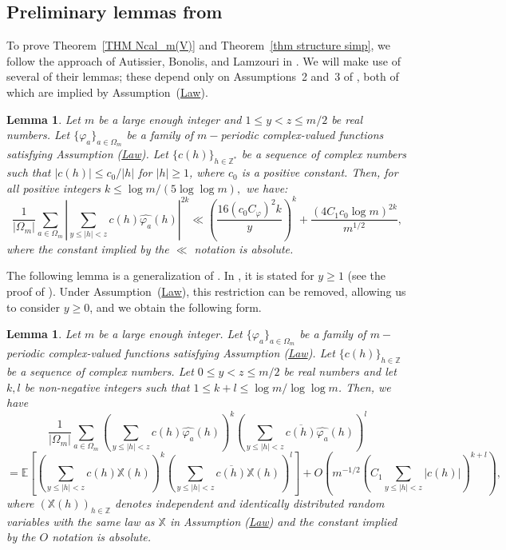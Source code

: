 \documentclass[12pt]{amsart}
\newtheorem{lem}[thm]{Lemma}
\theoremstyle{definition}
\numberwithin{equation}{section}
\numberwithin{equation}{section}
\def\E{\mathbb{E}}
\def\Z{\mathbb{Z}}
\def\Mp{C_\varphi}
\def\X{\mathbb{X}}
\def\E{\mathbb{E}}
\begin{document}
\subsection{Preliminary lemmas from \cite{ABL21}} 
To prove Theorem~\ref{THM Ncal_m(V)} and Theorem~\ref{thm structure simp}, we follow the approach of Autissier, Bonolis, and Lamzouri in \cite{ABL21}. We will make use of several of their lemmas; these depend only on Assumptions~2 and~3 of \cite{ABL21}, both of which are implied by Assumption~(\hyperlink{Ass Law}{Law}).

\begin{lem}\cite[Lemma 6.1]{ABL21}\label{lemme 6.3}
Let $m$ be a large enough integer and $1\leq y<z \leq m/2$ be real numbers. Let $\{\varphi_a\}_{ a \in\Omega_m} $ be a family of $m-$periodic complex-valued functions satisfying Assumption (\hyperlink{Ass Law}{Law}). Let $\{c(h)\}_{ h\in\Z^*} $ be a sequence of complex numbers such that $|c(h)| \leq c_0/|h|$
for $|h| \geq 1$, where $c_0$ is a positive constant.
Then, for all positive integers $k \leq \log m/(5 \log \log m),$ we have:
\[
\frac{1}{|\Omega_m|}
\sum_{a\in \Omega_m}
\left|
\sum_{y \leq|h|<z}
c(h)\widehat{\varphi_a}(h)
\right|^{2k }
\ll
\left(
\frac{16(c_0 \Mp)^2 k}{y}
\right)^k
+\frac{(4C_1 c_0\log m)^{2k}}{m^{1/2}},
\]
where the constant implied by the $\ll$ notation is absolute.
\end{lem}

The following lemma is a generalization of \cite[Proposition 2.2]{Lam20}. In \cite{ABL21}, it is stated for \(y\geq1\) (see the proof of \cite[Lemma 6.1]{ABL21}). Under Assumption~(\hyperlink{Ass Law}{Law}), this restriction can be removed, allowing us to consider \(y \geq 0\), and we obtain the following form.
\begin{lem}\label{Pro 2.2} Let $m$ be a large enough integer. Let $\{\varphi_a\}_{ a \in\Omega_m} $ be a family of $m-$periodic complex-valued functions satisfying Assumption (\hyperlink{Ass Law}{Law}).
Let $\{c(h)\}_{h\in\Z}$ be a sequence of complex numbers.
Let $0 \leq y < z \leq m/2$ be real numbers and let $k, l$ be non-negative integers such that $1\leq k+l \leq \log m/\log\log m$. 
Then, we have
\[\frac{1}{|\Omega_m|}
\sum_{a\in \Omega_m}
\left(
\sum_{y \leq|h|<z}
c(h)\widehat{\varphi_a}(h)
\right)^k 
\left(
\sum_{y \leq|h|<z}
\overline{c(h)}\widehat{\varphi_a}(h)\right)^l
\]\[
= \E
\left[
\left(
\sum_{y \leq|h|<z}
c(h)\X(h)
\right)^k
\left(
\sum_{y \leq|h|<z}
\overline{c(h)}\X(h)
\right)^l
\right]
+ O
\left(
m^{-1/2} \left(C_1 \sum_{y \leq |h|<z} |c(h)|
\right)^{k+l} \right),\]
where $(\X(h))_{h\in\Z}$ denotes independent and identically distributed random variables with the same law as $\X$ in Assumption (\hyperlink{Ass Law}{Law}) and the constant implied by the $O$ notation is absolute.
\end{lem}
\end{document}
